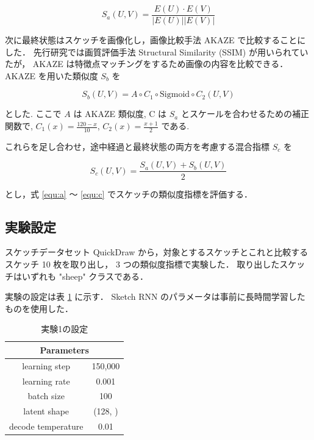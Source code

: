 \documentclass[twocolumn]{jarticle}     %
\begin{document}
\begin{equation}
  \label{equ:a}
  S_a(U, V) = \frac{E(U) \cdot E(V)}{|E(U)| |E(V)|}
\end{equation}


次に最終状態はスケッチを画像化し，画像比較手法 AKAZE で比較することにした．
先行研究では画質評価手法 Structural Similarity (SSIM) が用いられていたが，
AKAZE は特徴点マッチングをするため画像の内容を比較できる．
AKAZE を用いた類似度 $S_b$ を

\begin{equation}
  \label{equ:b}
  S_b(U, V) = A \circ C_1 \circ \mathrm{Sigmoid} \circ C_2 (U, V)
\end{equation}

とした.
ここで $A$ は AKAZE 類似度, C は $S_a$ とスケールを合わせるための補正関数で, $C_1(x) = \frac{120 - x}{10}$, $C_2(x) = \frac{x + 1}{2}$ である.


これらを足し合わせ，途中経過と最終状態の両方を考慮する混合指標 $S_c$ を

\begin{equation}
  \label{equ:c}
  S_c(U, V) = \frac{S_a(U, V) + S_b(U, V)}{2}
\end{equation}

とし，式 \ref{equ:a} ～ \ref{equ:c} でスケッチの類似度指標を評価する．

\subsection{実験設定}
スケッチデータセット QuickDraw から，対象とするスケッチとこれと比較するスケッチ 10 枚を取り出し，
3 つの類似度指標で実験した．
取り出したスケッチはいずれも "sheep" クラスである．

実験の設定は表 \ref{tab:setting1} に示す．
Sketch RNN のパラメータは事前に長時間学習したものを使用した．

\begin{table}[tb]
  \begin{center}
    \caption{実験1の設定}
    \begin{tabular}{|c|c|} \hline
      \multicolumn{2}{|c|}{Parameters}  \\ \hline
      learning step & 150,000 \\ \hline
      learning rate & 0.001 \\ \hline
      batch size & 100 \\ \hline
      latent shape & (128, ) \\ \hline
      decode temperature & 0.01 \\ \hline
    \end{tabular}
    \label{tab:setting1}
  \end{center}
\end{table}
\end{document}
